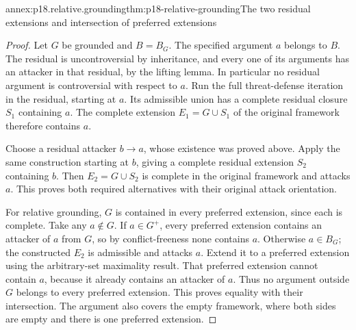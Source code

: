 \begin{annexitem}{annex:p18.relative.grounding}{thm:p18-relative-grounding}{The two residual extensions and intersection of preferred extensions}
\begin{proof}
Let \(G\) be grounded and
\(B=B_G\). The specified
argument \(a\) belongs
to \(B\). The residual
is uncontroversial by
inheritance, and every
one of its arguments
has an attacker in
that residual, by the
lifting lemma. In
particular no residual
argument is controversial
with respect to \(a\).
Run the full threat-defense
iteration in the residual,
starting at \(a\).
Its admissible union
has a complete residual
closure \(S_1\) containing
\(a\). The complete
extension \(E_1=G\cup S_1\)
of the original framework
therefore contains \(a\).

Choose a residual attacker
\(b\to a\), whose existence
was proved above. Apply
the same construction
starting at \(b\), giving
a complete residual
extension \(S_2\) containing
\(b\). Then \(E_2=G\cup S_2\)
is complete in the
original framework and
attacks \(a\). This
proves both required
alternatives with their
original attack orientation.

For relative grounding,
\(G\) is contained in
every preferred extension,
since each is complete.
Take any \(a\notin G\).
If \(a\in G^+\), every
preferred extension contains
an attacker of \(a\)
from \(G\), so by
conflict-freeness none
contains \(a\).
Otherwise \(a\in B_G\);
the constructed \(E_2\)
is admissible and attacks
\(a\). Extend it to
a preferred extension
using the arbitrary-set
maximality result. That
preferred extension cannot
contain \(a\), because
it already contains an
attacker of \(a\).
Thus no argument outside
\(G\) belongs to every
preferred extension.
This proves equality
with their intersection.
The argument also covers
the empty framework,
where both sides are
empty and there is
one preferred extension.
\end{proof}
\end{annexitem}

